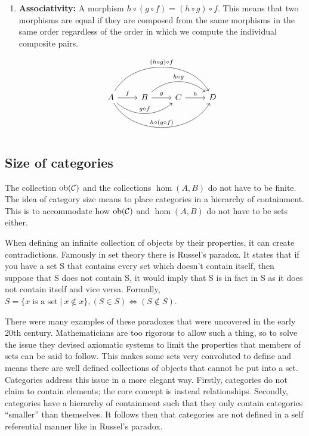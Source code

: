 \documentclass[10pt,a4paper,reqno]{amsart}
\numberwithin{figure}{section}
\begin{document}
\begin{enumerate}
        \item \textbf{Associativity:} A morphism $h\circ(g\circ f) = (h\circ
        g)\circ f$.  This means that two morphisms are equal if they are
        composed from the same morphisms in the same order regardless of the
        order in which we compute the individual composite pairs.

        \begin{equation}
        \begin{tikzcd}
                A \ar[r,"f"] \ar[rr,"g\circ f", bend right=40] \ar[rrr,"h\circ(g\circ f)",bend right=60] \ar[rrr, bend left=60,"(h\circ g)\circ f"]
                & B \ar[r,"g"] \ar[rr,"h\circ g",bend left=40]
                & C \ar[r,"h"] 
                & D
        \end{tikzcd}
        \end{equation}
\end{enumerate}

\subsection{Size of categories}
The collection $\operatorname{ob}(\mathcal{C})$ and the collections $\hom(A,B)$ do not have
to be finite. The idea of category size means to place categories in a
hierarchy of containment. This is to accommodate how $\operatorname{ob}(\mathcal{C})$ and
$\hom(A,B)$ do not have to be sets either.

When defining an infinite collection of objects by their properties, it can
create contradictions. Famously in set theory there is Russel's paradox. It
states that if you have a set S that contains every set which doesn't contain
itself, then suppose that S does not contain S, it would imply that S is in fact
in S as it does not contain itself and vice versa. Formally, $S = \{x\;\text{is
a set}\:|\:x\notin x\}, (S\in S) \iff (S\notin S)$.

There were many examples of these paradoxes that were uncovered in the early
20th century. Mathematicians are too rigorous to allow such a thing, so to solve
the issue they devised axiomatic systems to limit the properties that members of
sets can be said to follow. This makes some sets very convoluted to define and
means there are well defined collections of objects that cannot be put into a
set. Categories address this issue in a more elegant way. Firstly, categories
do not claim to contain elements; the core concept is instead relationships.
Secondly, categories have a hierarchy of containment such that they only contain
categories ``smaller'' than themselves. It follows then that categories are not
defined in a self referential manner like in Russel's paradox.
\end{document}
